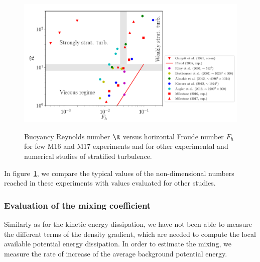 \begin{figure}
\includegraphics[width=\figwidth]{tmp/fig_R_vs_Fh_other_studies_with_milestone17}
\label{fig:RvsFh:other}

\caption{Buoyancy Reynolds number $\R$ versus horizontal Froude number $F_h$
for few M16 and M17 experiments and for other experimental and numerical
studies of stratified turbulence.}

\end{figure}

In figure~\ref{fig:RvsFh:other}, we compare the typical values of the
non-dimensional numbers reached in these experiments with values evaluated for
other studies.


\subsubsection{Evaluation of the mixing coefficient}

Similarly as for the kinetic energy dissipation, we have not been able to
measure the different terms of the density gradient, which are needed to
compute the local available potential energy dissipation. In order to estimate
the mixing, we measure the rate of increase of the average background potential
energy.

